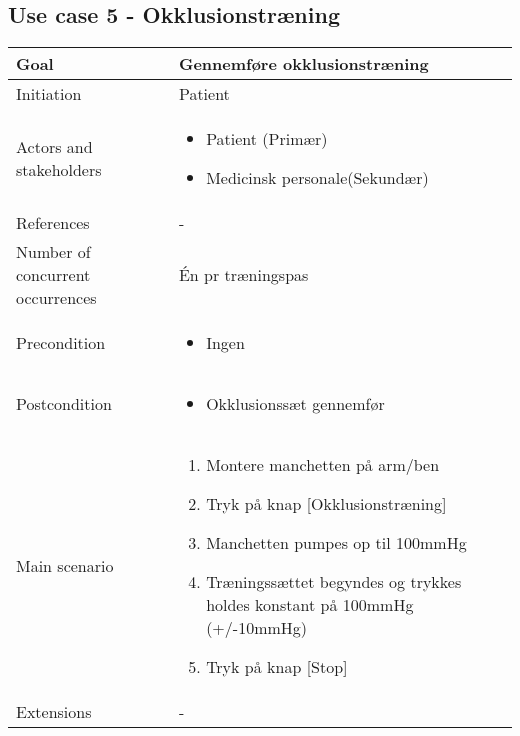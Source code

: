 	\subsection{Use case 5 - Okklusionstræning}
		\begin{center}
			\begin{tabular}{ | m{4cm} | m{8cm}| } 
				\hline
				Goal& Gennemføre okklusionstræning\\ 
				\hline
				Initiation &  Patient\\
				\hline
				Actors and stakeholders & 
				\begin{itemize}
					\item Patient (Primær)
					\item Medicinsk personale(Sekundær)
				\end{itemize} \\ 
				\hline
				References & - \\ 
				\hline
				Number of concurrent occurrences & Én pr træningspas \\ 
				\hline	
				Precondition & 
				\begin{itemize}
					\item Ingen
				\end{itemize} \\ 
				\hline
				Postcondition & 
				\begin{itemize}
					\item Okklusionssæt gennemfør
				\end{itemize} \\ 
				\hline
				Main scenario & \begin{enumerate}
					\item Montere manchetten på arm/ben
					\item Tryk på knap [Okklusionstræning]
					\item Manchetten pumpes op til 100mmHg
					\item Træningssættet begyndes og trykkes holdes konstant på 100mmHg (+/-10mmHg)
					\item Tryk på knap [Stop]
				\end{enumerate} \\ 
				\hline
				Extensions & -\\ 
				\hline
			\end{tabular}
		\end{center}